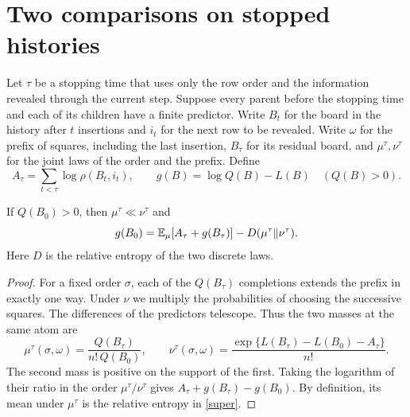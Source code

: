 \section{Two comparisons on stopped histories}\label{historias}
Let $\tau$ be a stopping time that uses only the row order and the information revealed through the current
step. Suppose every parent before the stopping time and each of its children have a finite predictor. Write
$B_t$ for the board in the history after $t$ insertions and $i_t$ for the next row to be revealed. Write
$\omega$ for the prefix of squares, including the last insertion, $B_\tau$ for its residual board, and
$\mu^\tau,\nu^\tau$ for the joint laws of the order and the prefix. Define
\[
 A_\tau=\sum_{t<\tau}\log\rho(B_t,i_t),\qquad g(B)=\log Q(B)-L(B)\quad(Q(B)>0).
\]

\begin{lema}\label{hist:igualdad}
If $Q(B_0)>0$, then $\mu^\tau\ll\nu^\tau$ and
\begin{equation}\label{super}
 g(B_0)=\mathbb{E}_\mu[A_\tau+g(B_\tau)]-D(\mu^\tau\Vert\nu^\tau).
\end{equation}
Here $D$ is the relative entropy of the two discrete laws.
\end{lema}
\begin{proof}
For a fixed order $\sigma$, each of the $Q(B_\tau)$ completions extends the prefix in exactly one way. Under
$\nu$ we multiply the probabilities of choosing the successive squares. The differences of the predictors
telescope. Thus the two masses at the same atom are
\[
 \mu^\tau(\sigma,\omega)=\frac{Q(B_\tau)}{n!\,Q(B_0)},\qquad
 \nu^\tau(\sigma,\omega)=\frac{\exp\{L(B_\tau)-L(B_0)-A_\tau\}}{n!}.
\]
The second mass is positive on the support of the first. Taking the logarithm of their ratio in the order
$\mu^\tau/\nu^\tau$ gives $A_\tau+g(B_\tau)-g(B_0)$. By definition, its mean under $\mu^\tau$ is the
relative entropy in \eqref{super}.
\end{proof}

